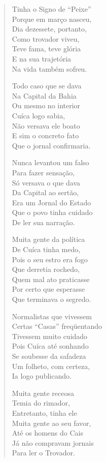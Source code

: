 \begin{verse}
Tinha o Signo de ``Peixe'' \\
Porque em março nasceu, \\
Dia dezessete, portanto, \\
Como trovador viveu, \\
Teve fama, teve glória \\
E na sua trajetória \\
Na vida também sofreu. 


Todo caso que se dava \\
Na Capital da Bahia \\
Ou mesmo no interior \\
Cuíca logo sabia, \\
Não versava ele boato \\
E sim o concreto fato \\
Que o jornal confirmaria. 

Nunca levantou um falso \\
Para fazer sensação, \\
Só versava o que dava \\
Da Capital ao sertão, \\
Era um Jornal do Estado \\
Que o povo tinha cuidado \\
De ler sua narração. 

Muita gente da política \\
De Cuíca tinha medo, \\
Pois o seu estro era fogo \\
Que derretia rochedo, \\
Quem mal ato praticasse \\
Por certo que esperasse \\
Que terminava o segredo. 

Normalistas que vivessem \\
Certas ``Casas'' freqüentando \\
Tivessem muito cuidado \\
Pois Cuíca até sonhando \\
Se soubesse da safadeza \\
Um folheto, com certeza, \\
Ia logo publicando. 


Muita gente receosa \\
Temia do rimador, \\
Entretanto, tinha ele \\
Muita gente ao seu favor, \\
Até os homens do Cais \\
Já não compravam jornais \\
Para ler o Trovador. 


\end{verse}
